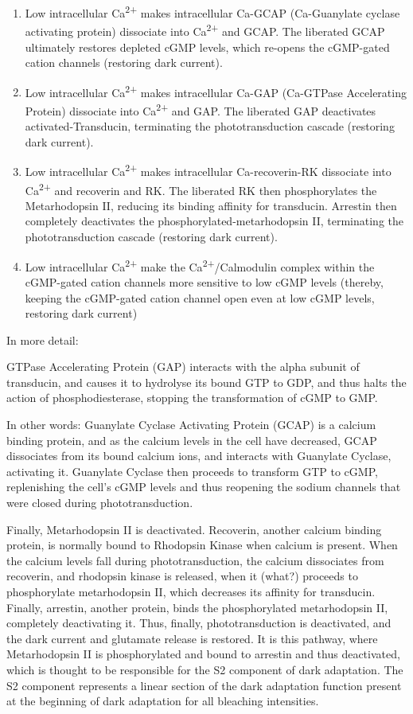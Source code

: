 \begin{enumerate}
\def\labelenumi{\arabic{enumi}.}
\tightlist
\item
  Low intracellular Ca\textsuperscript{2+} makes intracellular Ca-GCAP (Ca-Guanylate cyclase activating protein) dissociate into Ca\textsuperscript{2+} and GCAP. The liberated GCAP ultimately restores depleted cGMP levels, which re-opens the cGMP-gated cation channels (restoring dark current).
\item
  Low intracellular Ca\textsuperscript{2+} makes intracellular Ca-GAP (Ca-GTPase Accelerating Protein) dissociate into Ca\textsuperscript{2+} and GAP. The liberated GAP deactivates activated-Transducin, terminating the phototransduction cascade (restoring dark current).
\item
  Low intracellular Ca\textsuperscript{2+} makes intracellular Ca-recoverin-RK dissociate into Ca\textsuperscript{2+} and recoverin and RK. The liberated RK then phosphorylates the Metarhodopsin II, reducing its binding affinity for transducin. Arrestin then completely deactivates the phosphorylated-metarhodopsin II, terminating the phototransduction cascade (restoring dark current).
\item
  Low intracellular Ca\textsuperscript{2+} make the Ca\textsuperscript{2+}/Calmodulin complex within the cGMP-gated cation channels more sensitive to low cGMP levels (thereby, keeping the cGMP-gated cation channel open even at low cGMP levels, restoring dark current)
\end{enumerate}

In more detail:

GTPase Accelerating Protein (GAP) interacts with the alpha subunit of transducin, and causes it to hydrolyse its bound GTP to GDP, and thus halts the action of phosphodiesterase, stopping the transformation of cGMP to GMP.

In other words: Guanylate Cyclase Activating Protein (GCAP) is a calcium binding protein, and as the calcium levels in the cell have decreased, GCAP dissociates from its bound calcium ions, and interacts with Guanylate Cyclase, activating it. Guanylate Cyclase then proceeds to transform GTP to cGMP, replenishing the cell's cGMP levels and thus reopening the sodium channels that were closed during phototransduction.

Finally, Metarhodopsin II is deactivated. Recoverin, another calcium binding protein, is normally bound to Rhodopsin Kinase when calcium is present. When the calcium levels fall during phototransduction, the calcium dissociates from recoverin, and rhodopsin kinase is released, when it (what?) proceeds to phosphorylate metarhodopsin II, which decreases its affinity for transducin. Finally, arrestin, another protein, binds the phosphorylated metarhodopsin II, completely deactivating it. Thus, finally, phototransduction is deactivated, and the dark current and glutamate release is restored. It is this pathway, where Metarhodopsin II is phosphorylated and bound to arrestin and thus deactivated, which is thought to be responsible for the S2 component of dark adaptation. The S2 component represents a linear section of the dark adaptation function present at the beginning of dark adaptation for all bleaching intensities.

